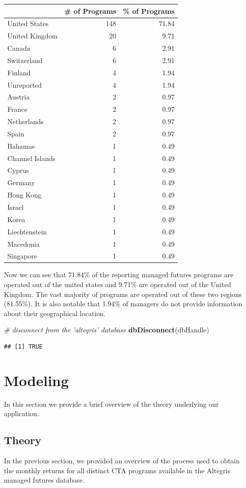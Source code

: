 \documentclass[]{article}
\newenvironment{Shaded}{\begin{snugshade}}{\end{snugshade}}
\newcommand{\KeywordTok}[1]{\textcolor[rgb]{0.13,0.29,0.53}{\textbf{{#1}}}}
\newcommand{\CommentTok}[1]{\textcolor[rgb]{0.56,0.35,0.01}{\textit{{#1}}}}
\newcommand{\NormalTok}[1]{{#1}}
\begin{document}
\begin{longtable}[c]{@{}lrr@{}}
\toprule
& \# of Programs & \% of Programs\tabularnewline
\midrule
\endhead
United States & 148 & 71.84\tabularnewline
United Kingdom & 20 & 9.71\tabularnewline
Canada & 6 & 2.91\tabularnewline
Switzerland & 6 & 2.91\tabularnewline
Finland & 4 & 1.94\tabularnewline
Unreported & 4 & 1.94\tabularnewline
Austria & 2 & 0.97\tabularnewline
France & 2 & 0.97\tabularnewline
Netherlands & 2 & 0.97\tabularnewline
Spain & 2 & 0.97\tabularnewline
Bahamas & 1 & 0.49\tabularnewline
Channel Islands & 1 & 0.49\tabularnewline
Cyprus & 1 & 0.49\tabularnewline
Germany & 1 & 0.49\tabularnewline
Hong Kong & 1 & 0.49\tabularnewline
Israel & 1 & 0.49\tabularnewline
Korea & 1 & 0.49\tabularnewline
Liechtenstein & 1 & 0.49\tabularnewline
Macedonia & 1 & 0.49\tabularnewline
Singapore & 1 & 0.49\tabularnewline
\bottomrule
\end{longtable}

Now we can see that 71.84\% of the reporting managed futures programs
are operated out of the united states and 9.71\% are operated out of the
United Kingdom. The vast majority of programs are operated out of these
two regions (81.55\%). It is also notable that 1.94\% of managers do not
provide information about their geographical location.

\begin{Shaded}
\begin{Highlighting}[]
\CommentTok{# disconnect from the 'altegris' database}
\KeywordTok{dbDisconnect}\NormalTok{(dbHandle)}
\end{Highlighting}
\end{Shaded}

\begin{verbatim}
## [1] TRUE
\end{verbatim}

\pagebreak

\section{Modeling}\label{modeling}

In this section we provide a brief overview of the theory underlying our
application.

\subsection{Theory}\label{theory}

In the previous section, we provided an overview of the process used to
obtain the monthly returns for all distinct CTA programs available in
the Altegris managed futures database.
\end{document}
